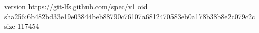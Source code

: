version https://git-lfs.github.com/spec/v1
oid sha256:6b482bd33e19e03844beb88790c76107a6812470583eb0a178b38b8e2c079c2c
size 117454
